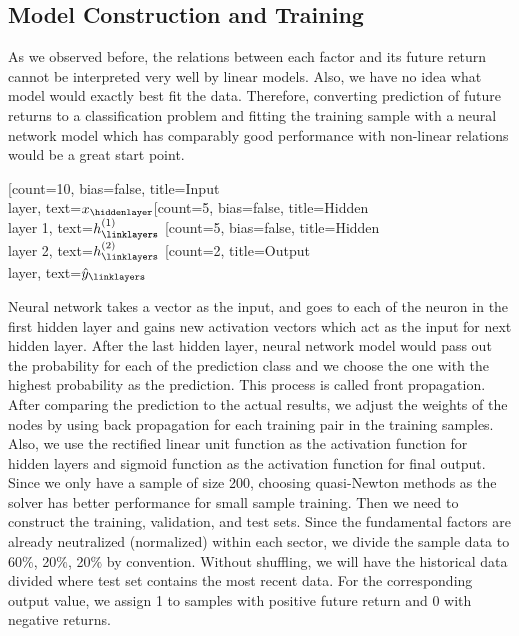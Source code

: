 \documentclass{article}
\begin{document}
\subsection{Model Construction and Training}
As we observed before, the relations between each factor and its future return cannot be interpreted very well by linear models. Also, we have no idea what model would exactly best fit the data. Therefore, converting prediction of future returns to a classification problem and fitting the training sample with a neural network model which has comparably good performance with non-linear relations would be a great start point. 
\begin{center}
    \begin{neuralnetwork}[height=10]
            \newcommand{\x}[2]{$x_#2$}
            \newcommand{\y}[2]{$\hat{y}_#2$}
            \newcommand{\hfirst}[2]{\small $h^{(1)}_#2$}
            \newcommand{\hsecond}[2]{\small $h^{(2)}_#2$}
            [count=10, bias=false, title=Input\\layer, text=\x]
            \hiddenlayer[count=5, bias=false, title=Hidden\\layer 1, text=\hfirst] \linklayers
            \hiddenlayer[count=5, bias=false, title=Hidden\\layer 2, text=\hsecond] \linklayers
            \outputlayer[count=2, title=Output\\layer, text=\y] \linklayers
    \end{neuralnetwork}
\end{center}
Neural network takes a vector as the input, and goes to each of the neuron in the first hidden layer and gains new activation vectors which act as the input for next hidden layer. After the last hidden layer, neural network model would pass out the probability for each of the prediction class and we choose the one with the highest probability as the prediction. This process is called front propagation. After comparing the prediction to the actual results, we adjust the weights of the nodes by using back propagation for each training pair in the training samples. Also, we use the rectified linear unit function as the activation function for hidden layers and sigmoid function as the activation function for final output. Since we only have a sample of size 200, choosing quasi-Newton methods as the solver has better performance for small sample training.
Then we need to construct the training, validation, and test sets. Since the fundamental factors are already neutralized (normalized) within each sector, we divide the sample data to 60$\%$, 20$\%$, 20$\%$ by convention. Without shuffling, we will have the historical data divided where test set contains the most recent data. For the corresponding output value, we assign 1 to samples with positive future return and 0 with negative returns.
\end{document}
